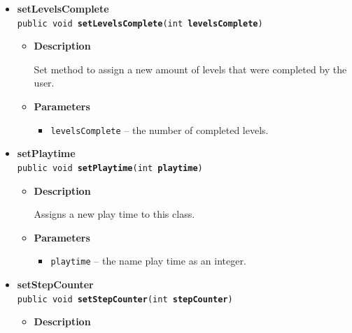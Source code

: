 \documentclass[11pt,a4paper]{report}
\begin{document}
{{{{{{{\begin{itemize}
{\begin{itemize}
{Checks if the database has a previous copy for the model.
}
\item{{\bf  Returns} -- 
true if the background storage has a record for the model; false otherwise. 
}%
\end{itemize}
}%
\item{ 
{\bf  setLevelsComplete}\\
\texttt{public void\ {\bf  setLevelsComplete}(\texttt{int} {\bf  levelsComplete})
\label{com.retroMachines.data.models.Statistic.setLevelsComplete(int)}}%
\begin{itemize}
\item{
{\bf  Description}

Set method to assign a new amount of levels that were completed by the user.
}
\item{
{\bf  Parameters}
  \begin{itemize}
   \item{
\texttt{levelsComplete} -- the number of completed levels.}
  \end{itemize}
}%
\end{itemize}
}%
\item{ 
{\bf  setPlaytime}\\
\texttt{public void\ {\bf  setPlaytime}(\texttt{int} {\bf  playtime})
\label{com.retroMachines.data.models.Statistic.setPlaytime(int)}}%
\begin{itemize}
\item{
{\bf  Description}

Assigns a new play time to this class.
}
\item{
{\bf  Parameters}
  \begin{itemize}
   \item{
\texttt{playtime} -- the name play time as an integer.}
  \end{itemize}
}%
\end{itemize}
}%
\item{ 
{\bf  setStepCounter}\\
\texttt{public void\ {\bf  setStepCounter}(\texttt{int} {\bf  stepCounter})
\label{com.retroMachines.data.models.Statistic.setStepCounter(int)}}%
\begin{itemize}
\item{
{\bf  Description}

}
\end{itemize}}
\end{itemize}}}}}}}}
\end{document}
